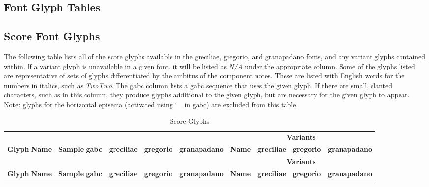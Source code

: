 \begin{landscape}

\section{Font Glyph Tables}\label{glyphtable}

\subsection{Score Font Glyphs}

The following table lists all of the score glyphs available in the greciliae,
gregorio, and granapadano fonts, and any variant glyphs contained within.  If a
variant glyph is unavailable in a given font, it will be listed as
{\itshape\small N/A} under the appropriate column.  Some of the glyphs listed
are representative of sets of glyphs differentiated by the ambitus of the
component notes.  These are listed with English words for the numbers in
italics, such as {\itshape TwoTwo}.  The gabc column lists a gabc sequence that
uses the given glyph.  If there are small, slanted characters, such as
 in this column, they produce glyphs additional to the given
glyph, but are necessary for the given glyph to appear.  Note: glyphs for the
horizontal episema (activated using {\ttfamily\char`_} in gabc) are excluded from
this table.

\newcommand\ScoreFontTable[1]{%
  \begin{longtable}{llccccccc}
      \caption{Score Glyphs}\\
      &&&&&\multicolumn{4}{c}{\bfseries Variants}\\
      \hhline{>{\arrayrulecolor{lightgray}}----->{\arrayrulecolor{black}}----}
      {\bfseries Glyph Name}&%
      {\scriptsize\bfseries Sample gabc}&%
      {\scriptsize\bfseries greciliae}&%
      {\scriptsize\bfseries gregorio}&%
      {\scriptsize\bfseries granapadano}&%
      {\scriptsize\bfseries Name}&%
      {\scriptsize\bfseries greciliae}&%
      {\scriptsize\bfseries gregorio}&%
      {\scriptsize\bfseries granapadano}\\
      \hline
    \endfirsthead
      &&&&&\multicolumn{4}{c}{\bfseries Variants}\\
      \hhline{>{\arrayrulecolor{lightgray}}----->{\arrayrulecolor{black}}----}
      {\bfseries Glyph Name}&%
      {\scriptsize\bfseries Sample gabc}&%
      {\scriptsize\bfseries greciliae}&%
      {\scriptsize\bfseries gregorio}&%
      {\scriptsize\bfseries granapadano}&%
      {\scriptsize\bfseries Name}&%
      {\scriptsize\bfseries greciliae}&%
      {\scriptsize\bfseries gregorio}&%
      {\scriptsize\bfseries granapadano}\\
      \hline
    \endhead
    \directlua{GregorioRef.emit_score_glyphs(#1)}
  \end{longtable}
}%
\ScoreFontTable{'greciliae','gregorio','granapadano'}


\end{landscape}
